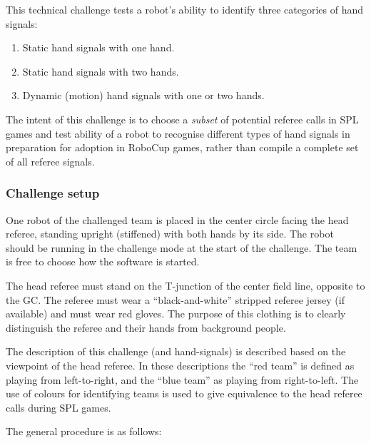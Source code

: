         This technical challenge tests a robot's ability to identify three categories of hand signals:
        \begin{enumerate}
            \item Static hand signals with one hand.
            \item Static hand signals with two hands.
            \item Dynamic (motion) hand signals with one or two hands.
        \end{enumerate}
        
        The intent of this challenge is to choose a \emph{subset} of potential referee calls in SPL games and test ability of a robot to recognise different types of hand signals in preparation for adoption in RoboCup games, rather than compile a complete set of all referee signals.

    \subsubsection{Challenge setup}

        One robot of the challenged team is placed in the center circle facing the head referee, standing upright (stiffened) with both hands by its side. The robot should be running in the challenge mode at the start of the challenge. The team is free to choose how the software is started.
        
        The head referee must stand on the T-junction of the center field line, opposite to the GC. The referee must wear a ``black-and-white'' stripped referee jersey (if available) and must  wear red gloves. The purpose of this clothing is to clearly distinguish the referee and their hands from background people. 
        
        The description of this challenge (and hand-signals) is described based on the viewpoint of the head referee. In these descriptions the ``red team'' is defined as playing from left-to-right, and the ``blue team'' as playing from right-to-left. The use of colours for identifying teams is used to give equivalence to the head referee calls during SPL games.
        
        The general procedure is as follows:

